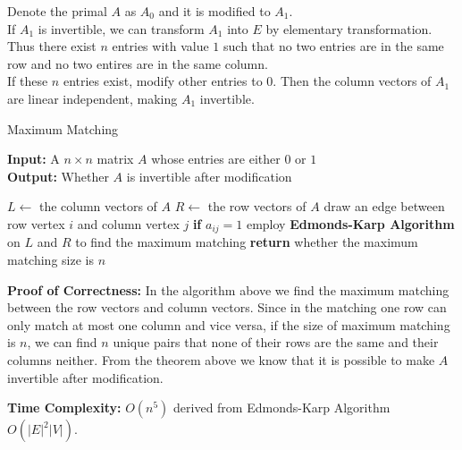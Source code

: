\documentclass{oxmathproblems}
\begin{document}
\begin{questions}
\miquestion
Denote the primal $A$ as $A_0$ and it is modified to $A_1$.\\
If $A_1$ is invertible, we can transform $A_1$ into $E$ by elementary transformation. Thus there exist $n$ entries with value $1$ such that no two entries are in the same row and no two entires are in the same column.\\
If these $n$ entries exist, modify other entries to $0$. Then the column vectors of $A_1$ are linear independent, making $A_1$ invertible.

\begin{algorithm}[h]
\caption{Maximum Matching}
\textbf{Input:} A $n\times n$ matrix $A$ whose entries are either $0$ or $1$\\
\textbf{Output:} Whether $A$ is invertible after modification
\begin{algorithmic}[1]
    \State $L\gets$ the column vectors of $A$\;
    \State $R\gets$ the row vectors of $A$\;
    \State draw an edge between row vertex $i$ and column vertex $j$ \textbf{if} $a_{ij}=1$\;
    \State employ \textbf{Edmonds-Karp Algorithm} on $L$ and $R$ to find the maximum matching\;
    \State \textbf{return} whether the maximum matching size is $n$
\end{algorithmic}
\end{algorithm}
\textbf{Proof of Correctness:} In the algorithm above we find the maximum matching between the row vectors and column vectors. 
Since in the matching one row can only match at most one column and vice versa, if the size of maximum matching is $n$, we can find $n$ unique pairs that none of their rows are the same and their columns neither.
From the theorem above we know that it is possible to make $A$ invertible after modification.

\textbf{Time Complexity:} $O(n^5)$ derived from Edmonds-Karp Algorithm $O(|E|^2|V|)$.

\miquestion
\begin{parts}

\end{parts}
\end{questions}
\end{document}

